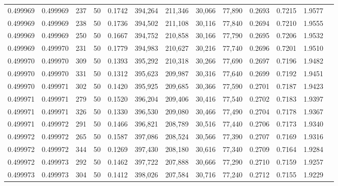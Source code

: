 \begin{tabular}{rrrrrrrrrrrrr}
0.499969 & 0.499969 &   237 &  50 &                                     0.1742 & 394,264 & 211,346 &  30,066 &  77,890 & 0.2693 & 0.7215 & 1.9577 \\
0.499969 & 0.499969 &   238 &  50 &                                     0.1736 & 394,502 & 211,108 &  30,116 &  77,840 & 0.2694 & 0.7210 & 1.9555 \\
0.499969 & 0.499969 &   250 &  50 &                                     0.1667 & 394,752 & 210,858 &  30,166 &  77,790 & 0.2695 & 0.7206 & 1.9532 \\
0.499969 & 0.499970 &   231 &  50 &                                     0.1779 & 394,983 & 210,627 &  30,216 &  77,740 & 0.2696 & 0.7201 & 1.9510 \\
0.499970 & 0.499970 &   309 &  50 &                                     0.1393 & 395,292 & 210,318 &  30,266 &  77,690 & 0.2697 & 0.7196 & 1.9482 \\
0.499970 & 0.499970 &   331 &  50 &                                     0.1312 & 395,623 & 209,987 &  30,316 &  77,640 & 0.2699 & 0.7192 & 1.9451 \\
0.499970 & 0.499971 &   302 &  50 &                                     0.1420 & 395,925 & 209,685 &  30,366 &  77,590 & 0.2701 & 0.7187 & 1.9423 \\
0.499971 & 0.499971 &   279 &  50 &                                     0.1520 & 396,204 & 209,406 &  30,416 &  77,540 & 0.2702 & 0.7183 & 1.9397 \\
0.499971 & 0.499971 &   326 &  50 &                                     0.1330 & 396,530 & 209,080 &  30,466 &  77,490 & 0.2704 & 0.7178 & 1.9367 \\
0.499971 & 0.499972 &   291 &  50 &                                     0.1466 & 396,821 & 208,789 &  30,516 &  77,440 & 0.2706 & 0.7173 & 1.9340 \\
0.499972 & 0.499972 &   265 &  50 &                                     0.1587 & 397,086 & 208,524 &  30,566 &  77,390 & 0.2707 & 0.7169 & 1.9316 \\
0.499972 & 0.499972 &   344 &  50 &                                     0.1269 & 397,430 & 208,180 &  30,616 &  77,340 & 0.2709 & 0.7164 & 1.9284 \\
0.499972 & 0.499973 &   292 &  50 &                                     0.1462 & 397,722 & 207,888 &  30,666 &  77,290 & 0.2710 & 0.7159 & 1.9257 \\
0.499973 & 0.499973 &   304 &  50 &                                     0.1412 & 398,026 & 207,584 &  30,716 &  77,240 & 0.2712 & 0.7155 & 1.9229 \\

\end{tabular}
